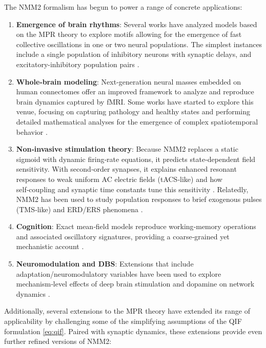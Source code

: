\documentclass[11pt]{article}
\numberwithin{equation}{section}
\begin{document}
The NMM2 formalism has begun to power a range of concrete applications:
\begin{enumerate}
 \item \textbf{Emergence of brain rhythms}: Several works have analyzed models based on the MPR theory
 to explore motifs allowing for the emergence of fast collective oscillations in one or two neural populations. The simplest instances include a single population of inhibitory neurons with synaptic delays\cite{Devalle:2017aa,Dumont:2019aa,Bi2020,Clusella2023}, 
 and excitatory-inhibitory population pairs \cite{Dumont:2019aa,Byrne2020,segneri2020,ReynerParra2022,MayoraCebollero2025}.
\item  \textbf{Whole‑brain modeling}: Next‑generation neural masses embedded on human connectomes offer an improved framework to analyze and reproduce brain dynamics captured by fMRI. 
    Some works have started to explore this venue, focusing on capturing pathology and healthy states \cite{Gerster2021,Rabuffo2021,perl_whole-brain_2023,Forrester2024} and performing detailed mathematical analyses for the emergence of complex spatiotemporal behavior \cite{clusellaComplexSpatiotemporalOscillations2023,delicado-moll2026}.
 \item \textbf{Non‑invasive stimulation theory}: Because NMM2 replaces a static sigmoid with dynamic firing‑rate equations, it predicts state‑dependent field sensitivity. With second‑order synapses, it explains enhanced resonant responses to weak uniform AC electric fields (tACS‑like) and how self‑coupling and synaptic time constants tune this sensitivity \cite{Clusella2023}. Relatedly, NMM2 has been used to study population responses to brief exogenous pulses (TMS‑like) and ERD/ERS phenomena \cite{Byrne2020,Byrne2022}.
\item \textbf{Cognition}: Exact mean‑field models reproduce working‑memory operations and associated oscillatory signatures, providing a coarse‑grained yet mechanistic account \cite{Schmidt2018,Taher2020}.
\item \textbf{Neuromodulation and DBS}: Extensions that include adaptation/neuromodulatory variables have been used to explore mechanism‑level effects of deep brain stimulation and dopamine on network dynamics \cite{Depannemaecker2024,Chen2022}.
\end{enumerate}

Additionally,
several   extensions to the MPR theory have extended its range
of applicability by challenging some of the simplifying assumptions of the QIF formulation \eqref{eq:qif}.
Paired with synaptic dynamics, these extensions provide even further refined versions of NMM2:
\end{document}
